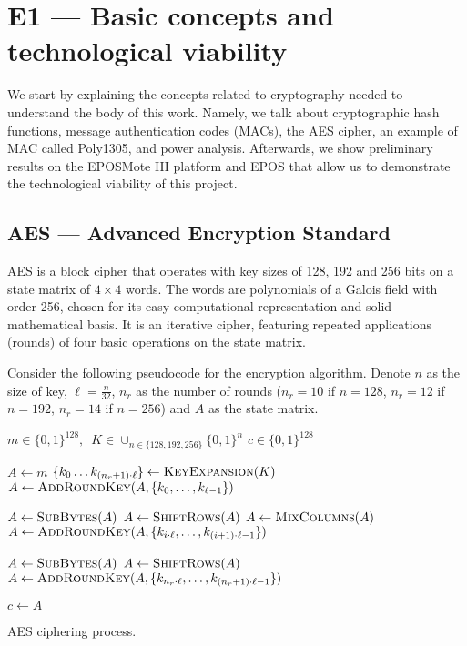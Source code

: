 \documentclass{../sftex/sftex}
\newcommand{\binwds}[1]{\{0, 1\}^{#1}}
\begin{document}
\section{E1 --- Basic concepts and technological viability}

We start by explaining the concepts related to cryptography needed to
understand the body of this work. Namely, we talk about cryptographic hash
functions, message authentication codes (MACs), the AES cipher, an example of
MAC called Poly1305, and power analysis. Afterwards, we show preliminary
results on the EPOSMote III platform and EPOS that allow us to demonstrate the
technological viability of this project.

\subsection{AES --- Advanced Encryption Standard}

AES is a block cipher that operates with key sizes of 128, 192 and 256 bits on
a state matrix of $4 \times 4$ words. The words are polynomials of a Galois
field with order 256, chosen for its easy computational representation and
solid mathematical basis. It is an iterative cipher, featuring repeated
applications (rounds) of four basic operations on the state matrix.

Consider the following pseudocode for the encryption algorithm. Denote $n$ as
the size of key, $\ell = \frac{n}{32}$, $n_r$ as the number of rounds ($n_r =
10$ if $n = 128$, $n_r = 12$ if $n = 192$, $n_r = 14$ if $n = 256$) and $A$ as
the state matrix.

\begin{algorithm}
  \begin{algorithmic}
    \REQUIRE{}  $m \in \binwds{128}, \enspace
      K \in \cup_{n \in \{128, 192, 256\}} \binwds{n}$
        \ENSURE{}  $c \in \binwds{128}$ 

    \STATE{}  $A \leftarrow m$
    \STATE{}  $\{k_{0} \dots k_{(n_{r} + 1) \cdot \ell}\}
      \leftarrow \textsc{KeyExpansion}(K)$
    \STATE{}  $A \leftarrow \textsc{AddRoundKey}(A,
      \{k_{0}, \dots, k_{\ell - 1}\})$

      \STATE{}  $A \leftarrow \textsc{SubBytes}(A)$
      \STATE{}  $A \leftarrow \textsc{ShiftRows}(A)$
      \STATE{}  $A \leftarrow \textsc{MixColumns}(A)$
      \STATE{}  $A \leftarrow \textsc{AddRoundKey}(A,
        \{k_{i \cdot \ell}, \dots, k_{(i + 1) \cdot \ell - 1}\})$
    \ENDFOR{}

    \STATE{}  $A \leftarrow \textsc{SubBytes}(A)$
    \STATE{}  $A \leftarrow \textsc{ShiftRows}(A)$
    \STATE{}  $A \leftarrow \textsc{AddRoundKey}(A,
      \{k_{n_{r} \cdot \ell}, \dots, k_{(n_{r} + 1) \cdot \ell - 1}\})$

    \STATE{}  $c \leftarrow A$
  \end{algorithmic}
  \caption{AES ciphering process.}
\end{algorithm}
\end{document}
